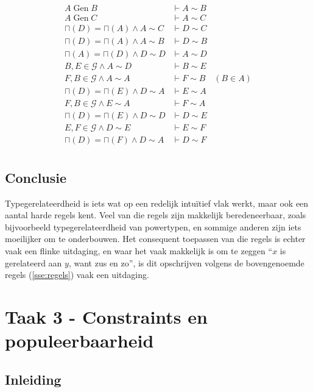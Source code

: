 \documentclass[11pt]{article}
\begin{document}
\begin{align*}
  A \operatorname{Gen} B                 & \vdash A \sim B &           \\
  A \operatorname{Gen} C                 & \vdash A \sim C &           \\
  \sqcap(D) = \sqcap(A) \wedge A \sim C  & \vdash D \sim C &           \\
  \sqcap(D) = \sqcap(A) \wedge A \sim B  & \vdash D \sim B &           \\
  \sqcap(A) = \sqcap(D) \wedge D \sim D  & \vdash A \sim D &           \\
  B, E \in \mathcal{G} \wedge A \sim D   & \vdash B \sim E &           \\
  F, B \in \mathcal{G} \wedge A \sim A   & \vdash F \sim B & (B \in A) \\
  \sqcap(D) = \sqcap (E) \wedge D \sim A & \vdash E \sim A &  \\
  F, B \in \mathcal{G} \wedge E \sim A   & \vdash F \sim A &  \\
  \sqcap(D) = \sqcap(E) \wedge D \sim D  & \vdash D \sim E &  \\
  E, F \in \mathcal{G} \wedge D \sim E   & \vdash E \sim F &  \\
  \sqcap(D) = \sqcap(F) \wedge D \sim A  & \vdash D \sim F & \\
\end{align*}

\subsection{Conclusie}

Typegerelateerdheid is iets wat op een redelijk intu\"itief vlak werkt,
maar ook een aantal harde regels kent. Veel van die regels zijn makkelijk
beredeneerbaar, zoals bijvoorbeeld typegerelateerdheid van powertypen, en 
sommige anderen zijn iets moeilijker om te onderbouwen. Het consequent toepassen
van die regels is echter vaak een flinke uitdaging, en waar het vaak makkelijk is
om te zeggen ``$x$ is gerelateerd aan $y$, want zus en zo'', is dit opschrijven
volgens de bovengenoemde regels (\ref{sse:regels}) vaak een uitdaging.

\section{Taak 3 - Constraints en populeerbaarheid}

\subsection{Inleiding}
\end{document}
